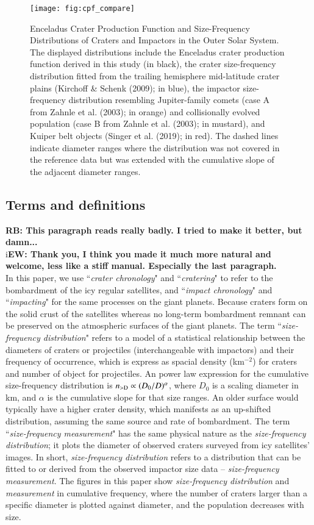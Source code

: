 \documentclass[preprint,12pt,3p,times,authoryear]{elsarticle}
\begin{document}
\begin{figure}
    \centering
    \texttt{[image: fig:cpf\_compare]}
    \caption{Enceladus Crater Production Function and Size-Frequency Distributions of Craters and Impactors in the Outer Solar System. The displayed distributions include the Enceladus crater production function derived in this study (in black), the crater size-frequency distribution fitted from the trailing hemisphere mid-latitude crater plains (Kirchoff & Schenk (2009); in blue), the impactor size-frequency distribution resembling Jupiter-family comets (case A from Zahnle et al. (2003); in orange) and collisionally evolved population (case B from Zahnle et al. (2003); in mustard), and Kuiper belt objects (Singer et al. (2019); in red). The dashed lines indicate diameter ranges where the distribution was not covered in the reference data but was extended with the cumulative slope of the adjacent diameter ranges.}
    \label{fig:placeholder}
\end{figure}

\subsection{Terms and definitions}
\label{term&def}
{\bf RB: This paragraph reads really badly. I tried to make it better, but damn...}\\
i{\bf EW: Thank you, I think you made it much more natural and welcome, less like a stiff manual.
Especially the last paragraph.} \\
In this paper, we use ``{\it crater chronology}" and ``{\it cratering}" to refer to the bombardment of the icy regular satellites, and ``{\it impact chronology}" and ``{\it impacting}" for the same processes on the giant planets. Because craters form on the solid crust of the satellites whereas no long-term bombardment remnant can be preserved on the atmospheric surfaces of the giant planets. The term
``{\it size-frequency distribution}" refers to a model of a statistical relationship between the diameters of craters or projectiles (interchangeable with impactors) and their frequency of occurrence, which is express as spacial density (km$^{-2}$) for craters and number of object for projectiles.
An power law expression for the cumulative size-frequency distribution is $n_{\rm >D} \propto (D_0/D)^\alpha$, %
where $D_0$ is a scaling diameter in km, and $\alpha$ is the cumulative slope for that size ranges. 
An older surface would typically have a higher crater density, which manifests as an up-shifted distribution, assuming the same source and rate of bombardment. The term ``{\it size-frequency measurement}" has the same physical nature as the {\it size-frequency distribution}; it plots the diameter of observed craters surveyed from icy satellites' images. In short, {\it size-frequency distribution} refers to a distribution that can be fitted to or derived from the observed impactor size data -- {\it size-frequency measurement}. The figures in this paper show {\it size-frequency distribution} and {\it measurement} in cumulative frequency, where the number of craters larger than a specific diameter is plotted against diameter, and the population decreases with size. \\
\end{document}
